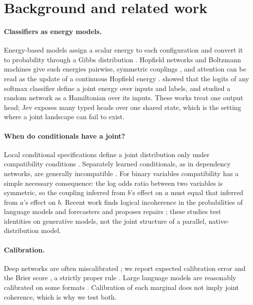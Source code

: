 \documentclass[11pt]{article}
\newcommand{\jev}{Jev}
\begin{document}
\section{Background and related work}

\paragraph{Classifiers as energy models.}
Energy-based models assign a scalar energy to each configuration and convert it to probability through a Gibbs distribution \citep{lecun2006tutorial}.
Hopfield networks and Boltzmann machines give such energies pairwise, symmetric couplings \citep{hopfield1982neural,ackley1985learning}, and attention can be read as the update of a continuous Hopfield energy \citep{ramsauer2020hopfield}.
\citet{grathwohl2019your} showed that the logits of any softmax classifier define a joint energy over inputs and labels, and \citet{winer2025deep} studied a random network as a Hamiltonian over its inputs.
These works treat one output head; \jev{} exposes many typed heads over one shared state, which is the setting where a joint landscape can fail to exist.

\paragraph{When do conditionals have a joint?}
Local conditional specifications define a joint distribution only under compatibility conditions \citep{besag1974spatial,hammersley1971markov,arnold1989compatible}.
Separately learned conditionals, as in dependency networks, are generally incompatible \citep{heckerman2000dependency}.
For binary variables compatibility has a simple necessary consequence: the log odds ratio between two variables is symmetric, so the coupling inferred from $b$'s effect on $a$ must equal that inferred from $a$'s effect on $b$.
Recent work finds logical incoherence in the probabilities of language models and forecasters \citep{fluri2023evaluating,paleka2025consistency,zhu2024incoherent} and proposes repairs \citep{kassner2021beliefbank,calanzone2024towards}; these studies test identities on generative models, not the joint structure of a parallel, native-distribution model.

\paragraph{Calibration.}
Deep networks are often miscalibrated \citep{guo2017calibration}; we report expected calibration error \citep{naeini2015obtaining} and the Brier score \citep{brier1950verification}, a strictly proper rule \citep{gneiting2007strictly}.
Large language models are reasonably calibrated on some formats \citep{kadavath2022language,tian2023just}.
Calibration of each marginal does not imply joint coherence, which is why we test both.
\end{document}
